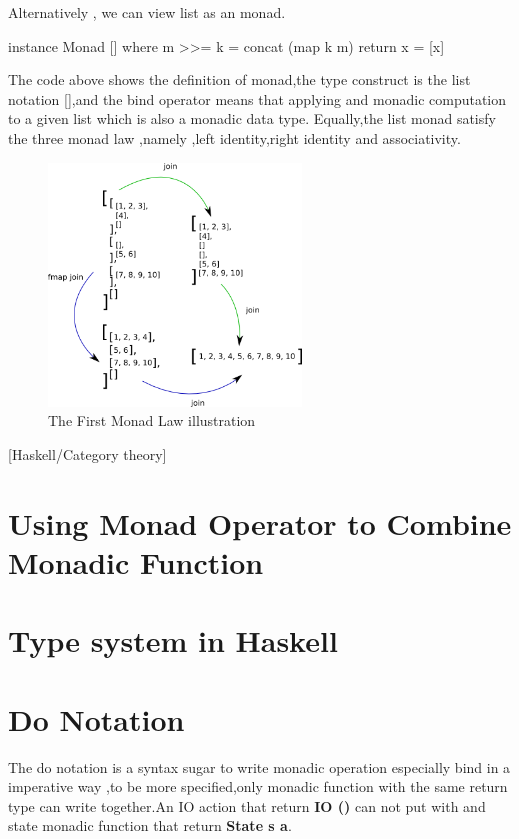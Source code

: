 Alternatively , we can view list as an monad.
\begin{hcode}
instance  Monad []  where
  m >>= k  = concat (map k m)
  return x = [x]
\end{hcode}

The code above shows the definition of monad,the type construct is the list notation [],and the bind operator means that applying and monadic computation to a given list which is also a monadic data type. Equally,the list monad satisfy the three monad law ,namely ,left identity,right identity and associativity.\\

\begin{figure}[H]
  \centering
	\includegraphics[width=0.60\textwidth]{pic/c3/list_monad.png}
	\caption{The First Monad Law illustration}
\end{figure} [Haskell/Category theory]



\section{Using Monad Operator to Combine Monadic Function}




\section{Type system in Haskell}
\section{Do Notation }
The do notation is a syntax sugar to write monadic operation especially bind in a imperative way ,to be more specified,only monadic function with the same return type can write together.An IO action that return \textbf{IO ()} can not put with and state monadic function that return \textbf{State s a}.

